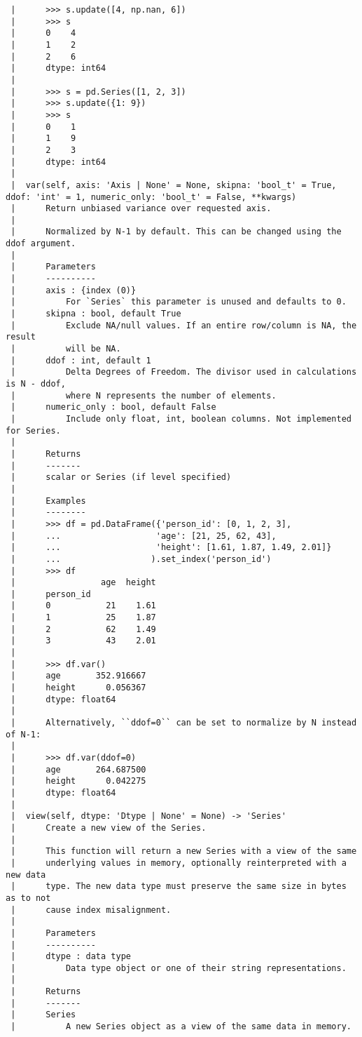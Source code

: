 \documentclass[
  letterpaper,
  DIV=11,
  numbers=noendperiod]{scrreprt}
\begin{document}
\begin{verbatim}
 |      >>> s.update([4, np.nan, 6])
 |      >>> s
 |      0    4
 |      1    2
 |      2    6
 |      dtype: int64
 |      
 |      >>> s = pd.Series([1, 2, 3])
 |      >>> s.update({1: 9})
 |      >>> s
 |      0    1
 |      1    9
 |      2    3
 |      dtype: int64
 |  
 |  var(self, axis: 'Axis | None' = None, skipna: 'bool_t' = True, ddof: 'int' = 1, numeric_only: 'bool_t' = False, **kwargs)
 |      Return unbiased variance over requested axis.
 |      
 |      Normalized by N-1 by default. This can be changed using the ddof argument.
 |      
 |      Parameters
 |      ----------
 |      axis : {index (0)}
 |          For `Series` this parameter is unused and defaults to 0.
 |      skipna : bool, default True
 |          Exclude NA/null values. If an entire row/column is NA, the result
 |          will be NA.
 |      ddof : int, default 1
 |          Delta Degrees of Freedom. The divisor used in calculations is N - ddof,
 |          where N represents the number of elements.
 |      numeric_only : bool, default False
 |          Include only float, int, boolean columns. Not implemented for Series.
 |      
 |      Returns
 |      -------
 |      scalar or Series (if level specified) 
 |      
 |      Examples
 |      --------
 |      >>> df = pd.DataFrame({'person_id': [0, 1, 2, 3],
 |      ...                   'age': [21, 25, 62, 43],
 |      ...                   'height': [1.61, 1.87, 1.49, 2.01]}
 |      ...                  ).set_index('person_id')
 |      >>> df
 |                 age  height
 |      person_id
 |      0           21    1.61
 |      1           25    1.87
 |      2           62    1.49
 |      3           43    2.01
 |      
 |      >>> df.var()
 |      age       352.916667
 |      height      0.056367
 |      dtype: float64
 |      
 |      Alternatively, ``ddof=0`` can be set to normalize by N instead of N-1:
 |      
 |      >>> df.var(ddof=0)
 |      age       264.687500
 |      height      0.042275
 |      dtype: float64
 |  
 |  view(self, dtype: 'Dtype | None' = None) -> 'Series'
 |      Create a new view of the Series.
 |      
 |      This function will return a new Series with a view of the same
 |      underlying values in memory, optionally reinterpreted with a new data
 |      type. The new data type must preserve the same size in bytes as to not
 |      cause index misalignment.
 |      
 |      Parameters
 |      ----------
 |      dtype : data type
 |          Data type object or one of their string representations.
 |      
 |      Returns
 |      -------
 |      Series
 |          A new Series object as a view of the same data in memory.

\end{verbatim}
\end{document}
